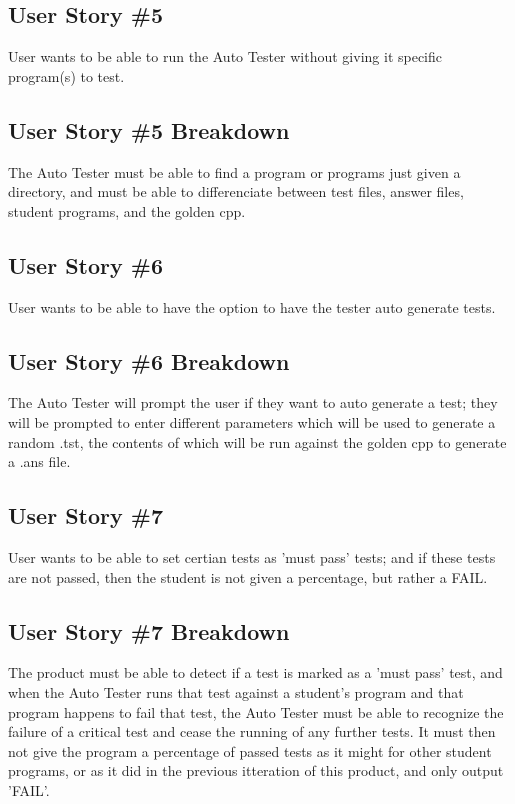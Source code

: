 \subsection{User Story \#5}
User wants to be able to run the Auto Tester without giving it specific program(s) to test.

\subsection{User Story \#5 Breakdown}
The Auto Tester must be able to find a program or programs just given a directory, and must be able to differenciate 
between test files, answer files, student programs, and the golden cpp.

\subsection{User Story \#6}
User wants to be able to have the option to have the tester auto generate tests.

\subsection{User Story \#6 Breakdown}
The Auto Tester will prompt the user if they want to auto generate a test; they will be prompted to enter different 
parameters which will be used to generate a random .tst, the contents of which will be run against the golden cpp to 
generate a .ans file.

\subsection{User Story \#7}
User wants to be able to set certian tests as 'must pass' tests; and if these 
tests are not passed, then the student is not given a percentage, but rather a FAIL.

\subsection{User Story \#7 Breakdown}
The product must be able to detect if a test is marked as a 'must pass' test, and when the Auto Tester 
runs that test against a student's program and that program happens to fail that test, the Auto Tester 
must be able to recognize the failure of a critical test and cease the running of any further tests. 
It must then not give the program a percentage of passed tests as it might for other student programs, 
or as it did in the previous itteration of this product, and only output 'FAIL'.

